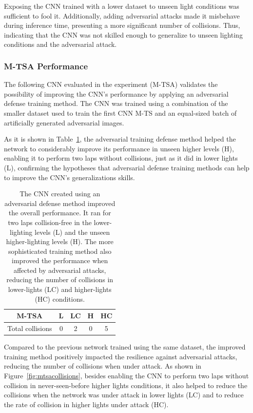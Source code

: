 \documentclass[12pt]{article}
\begin{document}
Exposing the CNN trained with a lower dataset to unseen light conditions was sufficient to fool it. Additionally, adding adversarial attacks made it misbehave during inference time, presenting a more significant number of collisions. Thus, indicating that the CNN was not skilled enough to generalize to unseen lighting conditions and the adversarial attack.

\subsubsection{M-TSA Performance}

The following CNN evaluated in the experiment (M-TSA) validates the possibility of improving the CNN's performance by applying an adversarial defense training method. The CNN was trained using a combination of the smaller dataset used to train the first CNN M-TS and an equal-sized batch of artificially generated adversarial images.

As it is shown in Table~\ref{tab:mtsa}, the adversarial training defense method helped the network to considerably improve its performance in unseen higher levels (H), enabling it to perform two laps without collisions, just as it did in lower lights (L), confirming the hypotheses that adversarial defense training methods can help to improve the CNN's generalizations skills.

\begin{table}[H]
\begin{center}
\begin{tabular}{ |c|c|c|c|c| } 
\hline
M-TSA & L & LC & H & HC \\
\hline
Total collisions & 0 & 2 & 0 & 5 \\
\hline
\end{tabular}
\caption{\label{tab:mtsa}The CNN created using an adversarial defense method improved the overall performance. It ran for two laps collision-free in the lower-lighting levels (L) and the unseen higher-lighting levels (H). The more sophisticated training method also improved the performance when affected by adversarial attacks, reducing the number of collisions in lower-lights (LC) and higher-lights (HC) conditions.}
\end{center}
\end{table}

Compared to the previous network trained using the same dataset, the improved training method positively impacted the resilience against adversarial attacks, reducing the number of collisions when under attack. As shown in Figure~\ref{fig:mtsacollisions}, besides enabling the CNN to perform two laps without collision in never-seen-before higher lights conditions, it also helped to reduce the collisions when the network was under attack in lower lights (LC) and to reduce the rate of collision in higher lights under attack (HC). 
\end{document}
